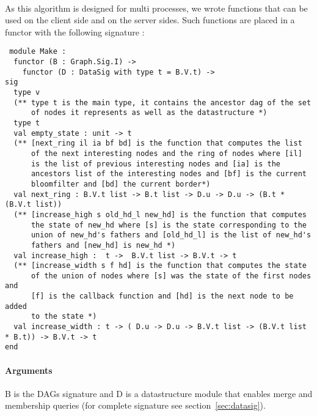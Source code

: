 \paragraph{} As this algorithm is designed for multi processes, we wrote functions that can be used on the client side and on the server sides. Such functions are placed in a functor with the following signature :
\begin{lstlisting}
 module Make :
  functor (B : Graph.Sig.I) ->
    functor (D : DataSig with type t = B.V.t) ->
sig
  type v
  (** type t is the main type, it contains the ancestor dag of the set
      of nodes it represents as well as the datastructure *)
  type t
  val empty_state : unit -> t
  (** [next_ring il ia bf bd] is the function that computes the list
      of the next interesting nodes and the ring of nodes where [il]
      is the list of previous interesting nodes and [ia] is the
      ancestors list of the interesting nodes and [bf] is the current
      bloomfilter and [bd] the current border*)
  val next_ring : B.V.t list -> B.t list -> D.u -> D.u -> (B.t * (B.V.t list))
  (** [increase_high s old_hd_l new_hd] is the function that computes
      the state of new_hd where [s] is the state corresponding to the
      union of new_hd's fathers and [old_hd_l] is the list of new_hd's
      fathers and [new_hd] is new_hd *)
  val increase_high :  t ->  B.V.t list -> B.V.t -> t
  (** [increase_width s f hd] is the function that computes the state
      of the union of nodes where [s] was the state of the first nodes and
      [f] is the callback function and [hd] is the next node to be added
      to the state *)
  val increase_width : t -> ( D.u -> D.u -> B.V.t list -> (B.V.t list * B.t)) -> B.V.t -> t
end
\end{lstlisting}
\paragraph{Arguments} B is the DAGs signature and D is a datastructure module that enables merge and membership queries (for complete signature see section~\ref{sec:datasig}).

